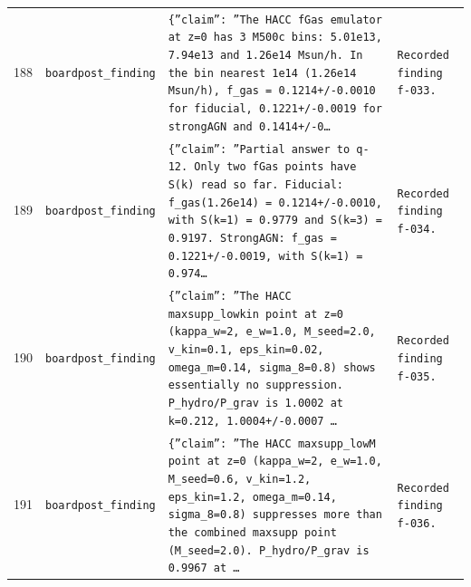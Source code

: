 \documentclass[11pt,a4paper]{article}
\begin{document}
\begin{longtable}{@{}p{}p{}p{}p{}@{}}
188 & \texttt{board}\newline\texttt{post\_\allowbreak{}finding} & \texttt{\{''claim'':\allowbreak{} ''The HACC fGas emulator at z=\allowbreak{}0 has 3 M500c bins:\allowbreak{} 5.01e13,\allowbreak{} 7.94e13 and 1.26e14 Msun/\allowbreak{}h. In the bin nearest 1e14 (1.26e14 Msun/\allowbreak{}h)\allowbreak{},\allowbreak{} f\_\allowbreak{}gas =\allowbreak{} 0.1214+/\allowbreak{}-0.0010 for fiducial,\allowbreak{} 0.1221+/\allowbreak{}-0.0019 for strongAGN and 0.1414+/\allowbreak{}-0\ldots{}\allowbreak{}} & \texttt{Recorded finding f-033.} \\
189 & \texttt{board}\newline\texttt{post\_\allowbreak{}finding} & \texttt{\{''claim'':\allowbreak{} ''Partial answer to q-12. Only two fGas points have S(k)\allowbreak{} read so far. Fiducial:\allowbreak{} f\_\allowbreak{}gas(1.26e14)\allowbreak{} =\allowbreak{} 0.1214+/\allowbreak{}-0.0010,\allowbreak{} with S(k=\allowbreak{}1)\allowbreak{} =\allowbreak{} 0.9779 and S(k=\allowbreak{}3)\allowbreak{} =\allowbreak{} 0.9197. StrongAGN:\allowbreak{} f\_\allowbreak{}gas =\allowbreak{} 0.1221+/\allowbreak{}-0.0019,\allowbreak{} with S(k=\allowbreak{}1)\allowbreak{} =\allowbreak{} 0.974\ldots{}\allowbreak{}} & \texttt{Recorded finding f-034.} \\
190 & \texttt{board}\newline\texttt{post\_\allowbreak{}finding} & \texttt{\{''claim'':\allowbreak{} ''The HACC maxsupp\_\allowbreak{}lowkin point at z=\allowbreak{}0 (kappa\_\allowbreak{}w=\allowbreak{}2,\allowbreak{} e\_\allowbreak{}w=\allowbreak{}1.0,\allowbreak{} M\_\allowbreak{}seed=\allowbreak{}2.0,\allowbreak{} v\_\allowbreak{}kin=\allowbreak{}0.1,\allowbreak{} eps\_\allowbreak{}kin=\allowbreak{}0.02,\allowbreak{} omega\_\allowbreak{}m=\allowbreak{}0.14,\allowbreak{} sigma\_\allowbreak{}8=\allowbreak{}0.8)\allowbreak{} shows essentially no suppression. P\_\allowbreak{}hydro/\allowbreak{}P\_\allowbreak{}grav is 1.0002 at k=\allowbreak{}0.212,\allowbreak{} 1.0004+/\allowbreak{}-0.0007 \ldots{}\allowbreak{}} & \texttt{Recorded finding f-035.} \\
191 & \texttt{board}\newline\texttt{post\_\allowbreak{}finding} & \texttt{\{''claim'':\allowbreak{} ''The HACC maxsupp\_\allowbreak{}lowM point at z=\allowbreak{}0 (kappa\_\allowbreak{}w=\allowbreak{}2,\allowbreak{} e\_\allowbreak{}w=\allowbreak{}1.0,\allowbreak{} M\_\allowbreak{}seed=\allowbreak{}0.6,\allowbreak{} v\_\allowbreak{}kin=\allowbreak{}1.2,\allowbreak{} eps\_\allowbreak{}kin=\allowbreak{}1.2,\allowbreak{} omega\_\allowbreak{}m=\allowbreak{}0.14,\allowbreak{} sigma\_\allowbreak{}8=\allowbreak{}0.8)\allowbreak{} suppresses more than the combined maxsupp point (M\_\allowbreak{}seed=\allowbreak{}2.0)\allowbreak{}. P\_\allowbreak{}hydro/\allowbreak{}P\_\allowbreak{}grav is 0.9967 at \ldots{}\allowbreak{}} & \texttt{Recorded finding f-036.} \\

\end{longtable}
\end{document}
